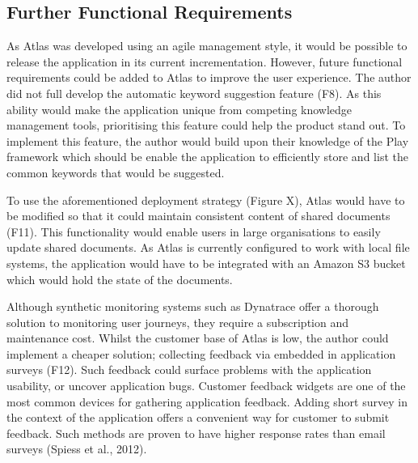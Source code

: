 \documentclass{article}
\begin{document}
\subsection{Further Functional Requirements}

As Atlas was developed using an agile management style, it would be possible to release the application in its current incrementation. However, future functional requirements could be added to Atlas to improve the user experience. The author did not full develop the automatic keyword suggestion feature (F8). As this ability would make the application unique from competing knowledge management tools, prioritising this feature could help the product stand out. To implement this feature, the author would build upon their knowledge of the Play framework which should be enable the application to efficiently store and list the common keywords that would be suggested.

To use the aforementioned deployment strategy (Figure X), Atlas would have to be modified so that it could maintain consistent content of shared documents (F11). This functionality would enable users in large organisations to easily update shared documents. As Atlas is currently configured to work with local file systems, the application would have to be integrated with an Amazon S3 bucket which would hold the state of the documents.

Although synthetic monitoring systems such as Dynatrace offer a thorough solution to monitoring user journeys, they require a subscription and maintenance cost. Whilst the customer base of Atlas is low, the author could implement a cheaper solution; collecting feedback via embedded in application surveys (F12). Such feedback could surface problems with the application usability, or uncover application bugs. Customer feedback widgets are one of the most common devices for gathering application feedback. Adding short survey in the context of the application offers a convenient way for customer to submit feedback. Such methods are proven to have higher response rates than email surveys (Spiess et al., 2012). 

\begin{table}[]
\centering
\small
\caption{Potential future functional requirements to be implemented into Atlas.}
\label{tab:my-table}
\end{table}
\end{document}
